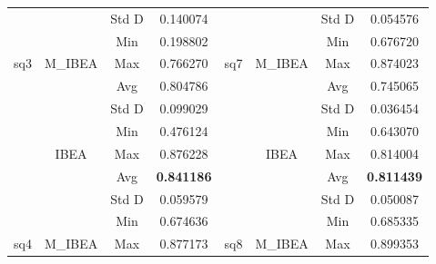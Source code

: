 \begin{table}[]
\begin{tabular}{cccccccc}
		&                           & Std D      & 0.140074          &                       &                                                   & Std D      & 0.054576          \\ \cline{3-4} \cline{7-8} 
		&                           & Min        & 0.198802          &                       &                                                   & Min        & 0.676720          \\ \cline{3-4} \cline{7-8} 
		\multirow{-8}{*}{sq3} & \multirow{-4}{*}{M\_IBEA} & Max        & 0.766270          & \multirow{-8}{*}{sq7} & \multirow{-4}{*}{M\_IBEA}                         & Max        & 0.874023          \\ \hline
		&                           & Avg        & 0.804786          &                       &                                                   & Avg        & 0.745065          \\ \cline{3-4} \cline{7-8} 
		&                           & Std D      & 0.099029          &                       &                                                   & Std D      & 0.036454          \\ \cline{3-4} \cline{7-8} 
		&                           & Min        & 0.476124          &                       &                                                   & Min        & 0.643070          \\ \cline{3-4} \cline{7-8} 
		& \multirow{-4}{*}{IBEA}    & Max        & 0.876228          &                       & \multirow{-4}{*}{IBEA}                            & Max        & 0.814004          \\ \cline{2-4} \cline{6-8} 
		&                           & Avg        & \textbf{0.841186} &                       & \cellcolor[HTML]{C0C0C0}                          & Avg        & \textbf{0.811439} \\ \cline{3-4} \cline{7-8} 
		&                           & Std D      & 0.059579          &                       & \cellcolor[HTML]{C0C0C0}                          & Std D      & 0.050087          \\ \cline{3-4} \cline{7-8} 
		&                           & Min        & 0.674636          &                       & \cellcolor[HTML]{C0C0C0}                          & Min        & 0.685335          \\ \cline{3-4} \cline{7-8} 
		\multirow{-8}{*}{sq4} & \multirow{-4}{*}{M\_IBEA} & Max        & 0.877173          & \multirow{-8}{*}{sq8} & \multirow{-4}{*}{\cellcolor[HTML]{C0C0C0}M\_IBEA} & Max        & 0.899353          \\ \hline
	\end{tabular}
\end{table}


